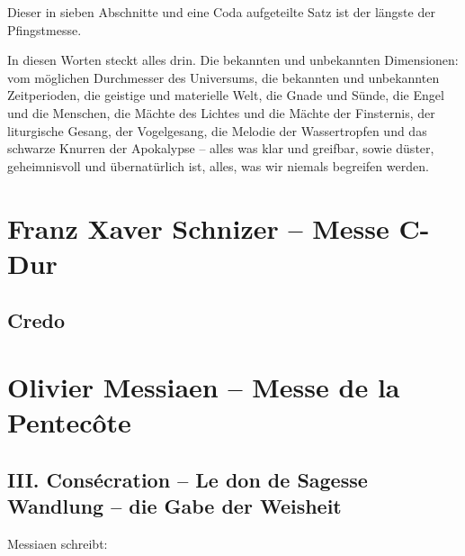 \documentclass[a5paper,twoside,fontsize=10pt]{scrartcl}
\newcommand{\frenchandgermantitle}[2]{\subsection*{#1 \\#2}}
\begin{document}
Dieser in sieben Abschnitte und eine Coda aufgeteilte Satz ist der längste der Pfingstmesse.

In diesen Worten steckt alles drin.
Die bekannten und unbekannten Dimensionen: vom möglichen Durchmesser des Universums, die bekannten und unbekannten Zeitperioden, die geistige und materielle Welt, die Gnade und Sünde, die Engel und die Menschen, die Mächte des Lichtes und die Mächte der Finsternis, der liturgische Gesang, der Vogelgesang, die Melodie der Wassertropfen und das schwarze Knurren der Apokalypse – alles was klar und greifbar, sowie düster, geheimnisvoll und übernatürlich ist, alles, was wir niemals begreifen werden.

\section*{Franz Xaver Schnizer – Messe C-Dur}
\subsection*{Credo}
\begin{Parallel}{0.45\textwidth}{0.5\textwidth}
    \RaggedRight
    
\end{Parallel}
\vspace{\baselineskip}

\section*{Olivier Messiaen – Messe de la Pentecôte}

\frenchandgermantitle{III. Consécration – Le don de Sagesse}{Wandlung – die Gabe der Weisheit}

\medskip

\noindent Messiaen schreibt:
\end{document}
